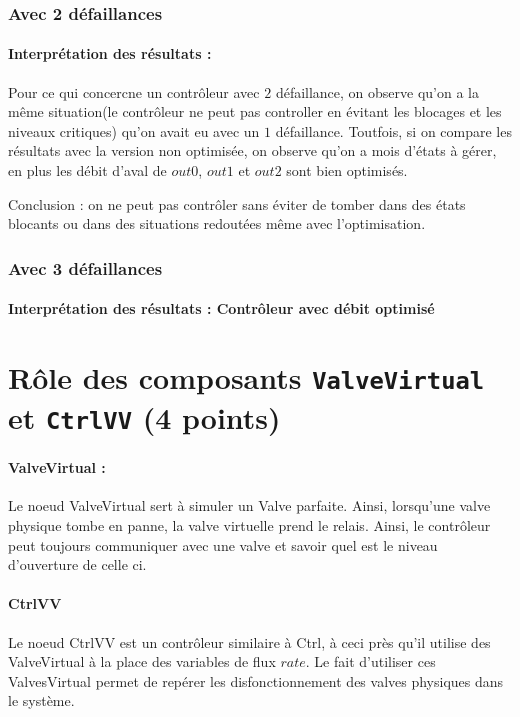 \documentclass[a4paper]{book}
\begin{document}
\subsubsection{Avec 2 défaillances}

\paragraph{Interprétation des résultats :}
Pour ce qui concercne un contrôleur avec $2$ défaillance, on observe qu'on a la même situation(le contrôleur ne peut pas controller en évitant les blocages et les niveaux critiques) qu'on avait eu avec un $1$ défaillance.
Toutfois, si on compare les résultats avec la version non optimisée, on observe qu'on a mois d'états à gérer, en plus les débit d'aval de $out0$, $out1$ et $out2$ sont bien optimisés.

Conclusion : on ne peut pas contrôler sans éviter de tomber dans des états blocants ou dans des situations redoutées même avec l'optimisation.

\subsubsection{Avec 3 défaillances}

\paragraph{Interprétation des résultats : Contrôleur avec débit optimisé}

\section{Rôle des composants {\tt ValveVirtual} et {\tt CtrlVV} (4 points)}
\paragraph{ValveVirtual : }
Le noeud ValveVirtual sert à simuler un Valve parfaite. Ainsi, lorsqu'une valve physique tombe en panne, la valve virtuelle prend le relais. Ainsi, le contrôleur peut toujours communiquer avec une valve et savoir quel est le niveau d'ouverture de celle ci.

\paragraph{CtrlVV}
Le noeud CtrlVV est un contrôleur similaire à Ctrl, à ceci près qu'il utilise des ValveVirtual à la place des variables de flux $rate$.
Le fait d'utiliser ces ValvesVirtual permet de repérer les disfonctionnement des valves physiques dans le système.
\end{document}
